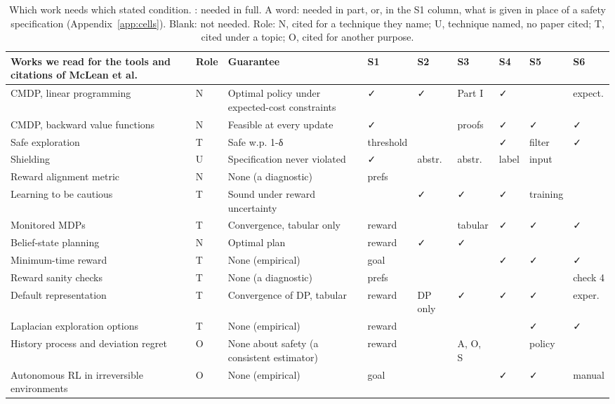 \documentclass{article}
\begin{document}
\begin{table}[!htb]
\centering\small\setlength{\tabcolsep}{3pt}
\caption{Which work needs which stated condition. \checkmark{}: needed in full. A word: needed in part, or, in the S1 column, what is given in place of a safety specification (Appendix~\ref{app:cells}). Blank: not needed. Role: N, cited for a technique they name; U, technique named, no paper cited; T, cited under a topic; O, cited for another purpose.}\label{tab:tool_conditions}
\begin{tabularx}{\textwidth}{@{}>{\raggedright\arraybackslash}Xl>{\raggedright\arraybackslash}Xllllll@{}}
\toprule
Works we read for the tools and citations of McLean et al. & Role & Guarantee & S1 & S2 & S3 & S4 & S5 & S6 \\
\midrule
CMDP, linear programming \citep{altman1999} & N & Optimal policy under expected-cost constraints & ✓ & ✓ & Part I & ✓ &  & expect. \\
CMDP, backward value functions \citep{satija2020} & N & Feasible at every update & ✓ &  & proofs & ✓ & ✓ & ✓ \\
Safe exploration \citep{wachi2023} & T & Safe w.p. 1-δ & threshold &  &  & ✓ & filter & ✓ \\
Shielding \citep{alshiekh2018} & U & Specification never violated & ✓ & abstr. & abstr. & label & input &  \\
Reward alignment metric \citep{muslimani2025} & N & None (a diagnostic) & prefs &  &  &  &  &  \\
Learning to be cautious \citep{mohammedalamen2025a} & T & Sound under reward uncertainty &  & ✓ & ✓ & ✓ & training &  \\
Monitored MDPs \citep{mohammedalamen2025b} & T & Convergence, tabular only & reward &  & tabular & ✓ & ✓ & ✓ \\
Belief-state planning \citep{kaelbling1998} & N & Optimal plan & reward & ✓ & ✓ &  &  &  \\
Minimum-time reward \citep{vasan2024} & T & None (empirical) & goal &  &  & ✓ & ✓ & ✓ \\
Reward sanity checks \citep{knox2023} & T & None (a diagnostic) & prefs &  &  &  &  & check 4 \\
Default representation \citep{tse2025} & T & Convergence of DP, tabular & reward & DP only & ✓ & ✓ & ✓ & exper. \\
Laplacian exploration options \citep{klissarov2023} & T & None (empirical) & reward &  &  &  & ✓ & ✓ \\
History process and deviation regret \citep{elelimy2025} & O & None about safety (a consistent estimator) & reward &  & A, O, S &  & policy &  \\
Autonomous RL in irreversible environments \citep{lee2025} & O & None (empirical) & goal &  &  & ✓ & ✓ & manual \\
\bottomrule
\end{tabularx}
\end{table}
\end{document}
